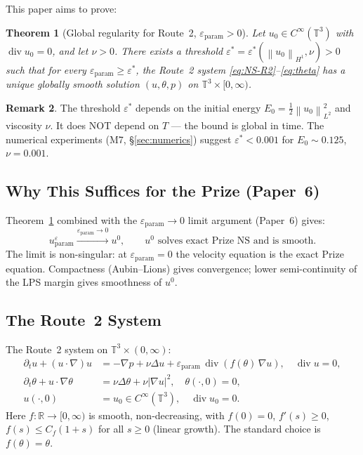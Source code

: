 \documentclass[11pt]{article}
\newtheorem{theorem}{Theorem}[section]
\theoremstyle{definition}
\newtheorem{remark}[theorem]{Remark}
\theoremstyle{remark}
\newcommand{\R}{\mathbb{R}}
\newcommand{\T}{\mathbb{T}}
\newcommand{\norm}[1]{\left\|#1\right\|}
\newcommand{\prt}{\partial_t}
\newcommand{\grad}{\nabla}
\newcommand{\divg}{\operatorname{div}}
\newcommand{\epsst}{\varepsilon^*}
\newcommand{\epsp}{\varepsilon_{\mathrm{param}}}
\begin{document}
This paper aims to prove:

\begin{theorem}[Global regularity for Route~2, $\epsp>0$]\label{thm:main}
  Let $u_0\in C^\infty(\T^3)$ with $\divg u_0=0$, and let $\nu>0$.
  There exists a threshold $\epsst=\epsst(\norm{u_0}_{H^1},\nu)>0$ such that
  for every $\epsp\geq\epsst$, the Route~2 system \eqref{eq:NS-R2}--\eqref{eq:theta}
  has a unique globally smooth solution $(u,\theta,p)$ on $\T^3\times[0,\infty)$.
\end{theorem}

\begin{remark}
  The threshold $\epsst$ depends on the initial energy $E_0=\frac{1}{2}\norm{u_0}^2_{L^2}$
  and viscosity $\nu$.  It does NOT depend on $T$ — the bound is global in time.
  The numerical experiments (M7, \S\ref{sec:numerics}) suggest $\epsst<0.001$
  for $E_0\sim 0.125$, $\nu=0.001$.
\end{remark}

\subsection{Why This Suffices for the Prize (Paper~6)}

Theorem~\ref{thm:main} combined with the $\epsp\to 0$ limit argument
(Paper~6) gives:
\begin{equation}
  u^\epsp \xrightarrow{\epsp\to 0} u^0, \qquad
  u^0 \text{ solves exact Prize NS and is smooth.}
\end{equation}
The limit is non-singular: at $\epsp=0$ the velocity equation is the exact
Prize equation.  Compactness (Aubin--Lions) gives convergence; lower
semi-continuity of the LPS margin gives smoothness of $u^0$.

\subsection{The Route~2 System}
\label{sec:system}

The Route~2 system on $\T^3\times(0,\infty)$:
\begin{align}
  \prt u + (u\cdot\grad)u &= -\grad p + \nu\Delta u
    + \epsp\,\divg(f(\theta)\,\grad u),
    \quad \divg u = 0, \label{eq:NS-R2}\\[4pt]
  \prt\theta + u\cdot\grad\theta &= \nu\Delta\theta + \nu|\grad u|^2,
    \quad \theta(\cdot,0) = 0, \label{eq:theta}\\[4pt]
  u(\cdot,0) &= u_0 \in C^\infty(\T^3), \quad \divg u_0 = 0. \label{eq:IC}
\end{align}
Here $f:\R\to[0,\infty)$ is smooth, non-decreasing, with $f(0)=0$,
$f'(s)\geq 0$, $f(s)\leq C_f(1+s)$ for all $s\geq 0$ (linear growth).
The standard choice is $f(\theta)=\theta$.
\end{document}
